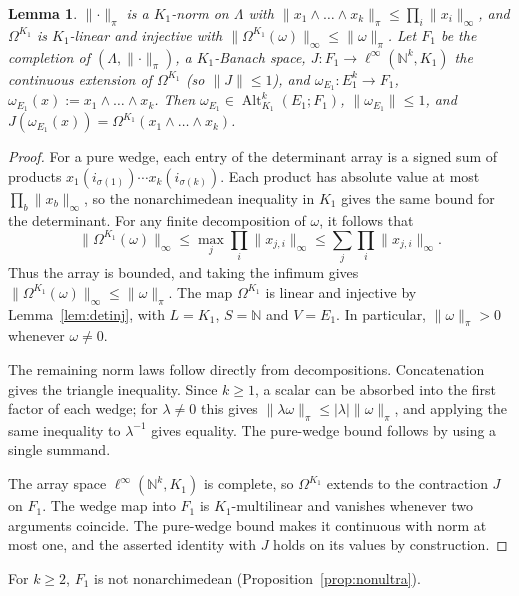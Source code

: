 \documentclass[11pt]{amsart}
\newtheorem{lemma}[theorem]{Lemma}
\theoremstyle{definition}
\theoremstyle{remark}
\numberwithin{equation}{section}
\newcommand{\N}{\mathbb N}
\newcommand{\Alt}{\operatorname{Alt}}
\newcommand{\linf}{\ell^\infty}
\newcommand{\abs}[1]{\lvert #1\rvert}
\newcommand{\norm}[1]{\lVert #1\rVert}
\theoremstyle{plain}
\theoremstyle{definition}
\theoremstyle{plain}
\begin{document}
\begin{lemma}\label{lem:proj}
$\norm\cdot_\pi$ is a $K_1$\nobreakdash-norm on $\Lambda$ with $\norm{x_1\wedge\dots\wedge x_k}_\pi\le\prod_i\norm{x_i}_\infty$, and
$\Omega^{K_1}$ is $K_1$\nobreakdash-linear and injective with $\norm{\Omega^{K_1}(\omega)}_\infty\le\norm\omega_\pi$. Let $F_1$ be the completion of
$(\Lambda,\norm\cdot_\pi)$, a $K_1$\nobreakdash-Banach space, $J\colon F_1\to\linf(\N^k,K_1)$ the continuous extension of $\Omega^{K_1}$ (so
$\norm J\le1$), and $\omega_{E_1}\colon E_1^k\to F_1$, $\omega_{E_1}(x):=x_1\wedge\dots\wedge x_k$. Then $\omega_{E_1}\in\Alt^k_{K_1}(E_1;F_1)$,
$\norm{\omega_{E_1}}\le1$, and $J(\omega_{E_1}(x))=\Omega^{K_1}(x_1\wedge\dots\wedge x_k)$.
\end{lemma}

\begin{proof}
For a pure wedge, each entry of the determinant array is a signed sum of products
$x_1(i_{\sigma(1)})\cdots x_k(i_{\sigma(k)})$. Each product has absolute value at most
$\prod_b\norm{x_b}_\infty$, so the nonarchimedean inequality in $K_1$ gives the same bound for the determinant.
For any finite decomposition of $\omega$, it follows that
\[
\norm{\Omega^{K_1}(\omega)}_\infty
\le\max_j\prod_i\norm{x_{j,i}}_\infty
\le\sum_j\prod_i\norm{x_{j,i}}_\infty.
\]
Thus the array is bounded, and taking the infimum gives
$\norm{\Omega^{K_1}(\omega)}_\infty\le\norm\omega_\pi$.
The map $\Omega^{K_1}$ is linear and injective by Lemma~\ref{lem:detinj}, with $L=K_1$, $S=\N$ and $V=E_1$.
In particular, $\norm\omega_\pi>0$ whenever $\omega\ne0$.

The remaining norm laws follow directly from decompositions. Concatenation gives the triangle inequality.
Since $k\ge1$, a scalar can be absorbed into the first factor of each wedge; for $\lambda\ne0$ this gives
$\norm{\lambda\omega}_\pi\le\abs\lambda\norm\omega_\pi$, and applying the same inequality to $\lambda^{-1}$ gives
equality. The pure-wedge bound follows by using a single summand.

The array space $\linf(\N^k,K_1)$ is complete, so $\Omega^{K_1}$ extends to the contraction $J$ on $F_1$.
The wedge map into $F_1$ is $K_1$\nobreakdash-multilinear and vanishes whenever two arguments coincide. The pure-wedge
bound makes it continuous with norm at most one, and the asserted identity with $J$ holds on its values by
construction.
\end{proof}

For $k\ge2$, $F_1$ is not nonarchimedean (Proposition~\ref{prop:nonultra}).
\end{document}
